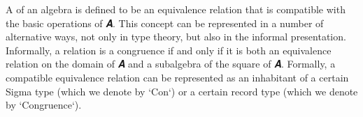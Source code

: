 A  of an algebra  is defined to be an equivalence relation that is compatible with the basic operations of \ab 𝑨. This concept can be represented in a number of alternative ways, not only in type
theory, but also in the informal presentation.  Informally, a relation is a congruence if and only if it is both an equivalence relation on the domain of \ab 𝑨 and a subalgebra of the square of \ab 𝑨.  Formally, a compatible equivalence relation can be represented as an inhabitant of a certain Sigma type (which we denote by `Con`) or a certain record type (which we denote by `Congruence`).
\ccpad
\begin{code}%
\>[0]\AgdaSpace{}%
\AgdaSymbol{:}\AgdaSpace{}%
\AgdaSymbol{\{}\AgdaSpace{}%
\AgdaSymbol{:}\AgdaSpace{}%
\AgdaSymbol{\}(}\AgdaSpace{}%
\AgdaSymbol{:}\AgdaSpace{}%
\AgdaSpace{}%
\AgdaSpace{}%
\AgdaSymbol{)}\AgdaSpace{}%
\AgdaSpace{}%
\AgdaSpace{}%
\AgdaSpace{}%
\<%
\\
\>[0]\AgdaSpace{}%
\AgdaSymbol{\{}\AgdaSymbol{\}}\AgdaSpace{}%
\AgdaSpace{}%
\AgdaSymbol{=}\AgdaSpace{}%
\AgdaSpace{}%
\AgdaSpace{}%
\AgdaSpace{}%
\AgdaSymbol{(}\AgdaSpace{}%
\AgdaSpace{}%
\AgdaSpace{}%
\AgdaSpace{}%
\AgdaSpace{}%
\AgdaSpace{}%
\AgdaSymbol{)}\AgdaSpace{}%
\AgdaFunction{,}\AgdaSpace{}%
\AgdaSpace{}%
\AgdaSpace{}%
\AgdaSpace{}%
\AgdaSpace{}%
\AgdaSpace{}%
\<%
\\
%
\\[\AgdaEmptyExtraSkip]%
\>[0]\AgdaSpace{}%
\AgdaSpace{}%
\AgdaSymbol{\{}\AgdaSpace{}%
\AgdaSpace{}%
\AgdaSymbol{:}\AgdaSpace{}%
\AgdaSymbol{\}}\AgdaSpace{}%
\AgdaSymbol{(}\AgdaSpace{}%
\AgdaSymbol{:}\AgdaSpace{}%
\AgdaSpace{}%
\AgdaSpace{}%
\AgdaSymbol{)}\AgdaSpace{}%
\AgdaSymbol{:}\AgdaSpace{}%
\AgdaSpace{}%
\AgdaSpace{}%
\AgdaSpace{}%

\end{code}

